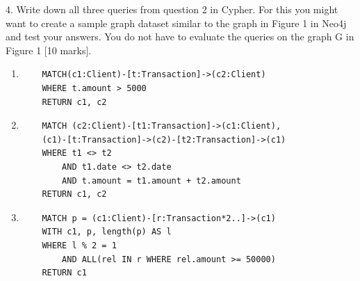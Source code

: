 \documentclass[12pt]{article}
\begin{document}
4. Write down all three queries from question 2 in Cypher. For this you
might want to create a sample graph dataset similar to the graph in
Figure 1 in Neo4j and test your answers. You do not have to evaluate
the queries on the graph G in Figure 1 [10 marks].

\begin{enumerate}[label=(\alph*)]

    \item
    \begin{lstlisting}
    MATCH(c1:Client)-[t:Transaction]->(c2:Client)
    WHERE t.amount > 5000
    RETURN c1, c2
    \end{lstlisting}


    \item
    \begin{lstlisting}
    MATCH (c2:Client)-[t1:Transaction]->(c1:Client),
    (c1)-[t:Transaction]->(c2)-[t2:Transaction]->(c1)
    WHERE t1 <> t2
        AND t1.date <> t2.date
        AND t.amount = t1.amount + t2.amount
    RETURN c1, c2
    \end{lstlisting}

    \item 
    \begin{lstlisting}
    MATCH p = (c1:Client)-[r:Transaction*2..]->(c1)
    WITH c1, p, length(p) AS l
    WHERE l % 2 = 1
        AND ALL(rel IN r WHERE rel.amount >= 50000)
    RETURN c1
    \end{lstlisting}
\end{enumerate}
\end{document}
